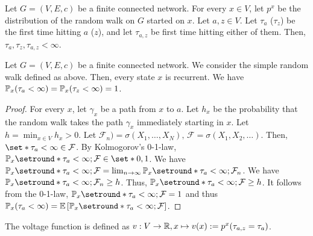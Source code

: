 \begin{lem}
  Let $G=(V,E,c)$ be a finite connected network. For every $x\in V$, let \(p^x\) be the distribution of the random walk on $G$ started on $x$. Let $a,z \in V$. Let $\tau_a$ ($\tau_z$) be the first time hitting $a$ ($z$), and let $\tau_{a,z}$ be first time hitting either of them. Then, $\tau_a,\tau_z,\tau_{a,z}< \infty$.
\end{lem}

\begin{fact}
  Let $G=(V,E,c)$ be a finite connected network. We consider the simple random walk defined as above. Then, every state $x$ is recurrent. We have $\mathbb{P}_x(\tau_a < \infty)= \mathbb{P}_x(\tau_z<\infty)=1$.
\end{fact}
\begin{proof}
  For every $x$, let $\gamma_x$ be a path from $x$ to $a$. Let $h_x$ be the probability that the random walk takes the path $\gamma_x$ immediately starting in $x$. Let $h= \min_{x\in V}h_x>0$. Let $\mathcal{F}_n ) = \sigma(X_1, \dots, X_N), \, \mathcal{F}=\sigma(X_1, X_2, \dots)$. Then, $\set*{\tau_a < \infty } \in \FFF$. By Kolmogorov's 0-1-law, $\mathbb{P}_x \setround*{\tau_a<\infty ; \FFF} \in \set*{0,1 }$. We have \(\mathbb{P}_x \setround*{\tau_a < \infty  ; \mathcal{F}} = \lim_{n \to \infty} \mathbb{P}_x \setround*{\tau_a < \infty ; \mathcal{F}_n}\). We have \(\mathbb{P}_x \setround*{\tau_a < \infty ;\mathcal{F}_n} \geq h \). Thus, \(\mathbb{P}_x \setround*{\tau_a <\infty  ;\mathcal{F}}\geq h\). It follows from the 0-1-law, $\mathbb{P}_x \setround*{ \tau_a < \infty ;\mathcal{F}}=1$ and thus \(\mathbb{P}_x(\tau_a < \infty) = \mathbb{E} \left[\mathbb{P}_x \setround*{\tau_a <\infty; \mathcal{F}}\right]\). 
\end{proof}



\begin{defn}
  The voltage function is defined as $v: V \to \mathbb{R}, x \mapsto v(x):=p^x(\tau_{a,z}=\tau_a)$.
\end{defn}


